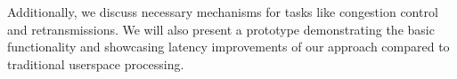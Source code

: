 Additionally, we discuss necessary mechanisms for tasks like congestion control and
retransmissions.
We will also present a prototype demonstrating the basic functionality and
showcasing latency improvements of our approach compared to traditional userspace processing.







